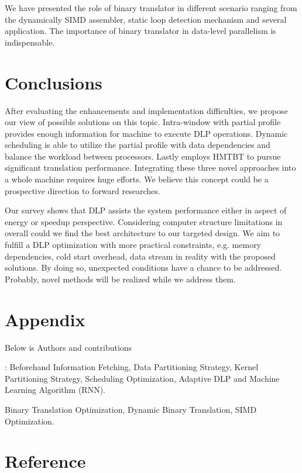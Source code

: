 \documentclass[sigconf, nonacm, natbib=false]{acmart}
\begin{document}
We have presented the role of binary translator in different scenario ranging from the dynamically SIMD assembler, static loop detection mechanism and several application. The importance of binary translator in data-level parallelism is indispensable. 

\section{Conclusions}
After evaluating the enhancements and implementation difficulties, we propose our view of possible solutions on this topic. Intra-window with partial profile provides enough information for machine to execute DLP operations. Dynamic scheduling is able to utilize the partial profile with data dependencies and balance the workload between processors. Lastly employs HMTBT to pursue significant translation performance. Integrating these three novel approaches into a whole machine requires huge efforts. We believe this concept could be a prospective direction to forward researches.

Our survey shows that DLP assists the system performance either in aspect of energy or speedup perspective. Considering computer structure limitations in overall could we find the best architecture to our targeted design. We aim to fulfill a DLP optimization with more practical constraints, e.g. memory dependencies, cold start overhead, data stream in reality with the proposed solutions. By doing so, unexpected conditions have a chance to be addressed.
Probably, novel methods will be realized while we address them. 

\section{Appendix}
\noindent Below is Authors and contributions

: Beforehand Information Fetching, Data Partitioning Strategy, Kernel Partitioning Strategy, Scheduling Optimization, Adaptive DLP and Machine Learning Algorithm (RNN).

 Binary Translation Optimization, Dynamic Binary Translation, SIMD Optimization.

\section{Reference}
\printbibliography[heading=none]
\end{document}
